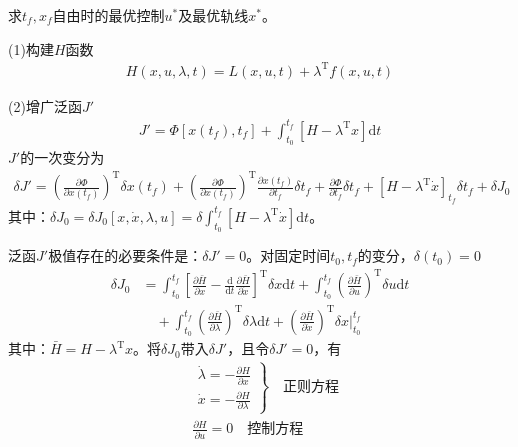             求$t_f,x_f$自由时的最优控制$u^*$及最优轨线$x^*$。
            \par
            (1)构建$H$函数
            \begin{align*}
            H(x,u,\lambda,t) = L(x,u,t)+\lambda^\mathrm{T}f(x,u,t)
            \end{align*}
            \par
            (2)增广泛函$J'$
            \begin{align*}
            J'= \Phi[x(t_f),t_f]+\int_{t_0}^{t_f}[H - \lambda^\mathrm{T}x]\mathrm{d}t
            \end{align*}
            $J'$的一次变分为
            \begin{align*}
            \delta J' = \left( \frac{\partial \Phi}{\partial x(t_f)} \right)^\mathrm{T} \delta x(t_f) + \left( \frac{\partial \Phi}{\partial x(t_f)} \right)^\mathrm{T} \frac{\partial x(t_f)}{\partial t_f}\delta t_f+ \frac{\partial \Phi}{\partial t_f}\delta t_f+ [H-\lambda^\mathrm{T}\dot{x}]_{t_f} \delta t_f + \delta J_0
            \end{align*}
            其中：$\delta J_0 = \delta J_0[x,\dot{x},\lambda,u] = \delta \int_{t_0}^{t_f}[H-\lambda^\mathrm{T}\dot{x}]\mathrm{d}t$。
            \par
            泛函$J'$极值存在的必要条件是：$\delta J' = 0$。对固定时间$t_0,t_f$的变分，$\delta (t_0) = 0$
            \begin{align*}
            \delta J_0 &= \int_{t_0}^{t_f} \left[\frac{\partial \bar{H}}{\partial x} - \frac{\mathrm{d}}{\mathrm{d}t}\frac{\partial \bar{H}}{\partial \dot{x}}\right]^\mathrm{T}\delta x\mathrm{d}t +\int_{t_0}^{t_f} \left( \frac{\partial \bar{H}}{\partial u} \right) ^\mathrm{T}\delta u\mathrm{d}t\\
            &\quad +\int_{t_0}^{t_f} \left( \frac{\partial \bar{H}}{\partial \lambda} \right) ^\mathrm{T}\delta \lambda \mathrm{d}t+ \left( \frac{\partial \bar{H}}{\partial \dot{x}} \right)^\mathrm{T} \delta x\Big|_{t_0}^{t_f}
            \end{align*}
            其中：$\bar{H} = H - \lambda ^\mathrm{T}x$。将$\delta J_0$带入$\delta J'$，且令$\delta J'=0$，有
            \begin{align*}
            & \left.
            \begin{aligned}
            \dot{\lambda} = -\frac{\partial H}{\partial x}\\
            \dot{x} = -\frac{\partial H}{\partial \lambda}
            \end{aligned}
            \right\}
            \quad \text{正则方程}\\
            & \frac{\partial H}{\partial u} = 0\quad \text{控制方程}
            \end{align*}
